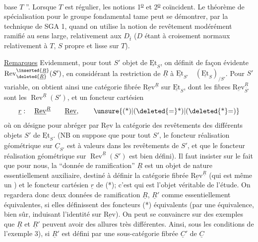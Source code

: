 base $T$ ''. Lorsque $T$ est régulier, les notions 1\textsuperscript{\uline{o}} et 2\textsuperscript{\uline{o}} coïncident. Le théorème de spécialisation pour le groupe fondamental tame peut se démontrer, par la technique de SGA 1, quand on utilise la notion de revêtement modérément ramifié au sens large, relativement aux $D_{\bar{t}}$  ($D$ étant à croisement normaux relativement à $T$, $S$ propre et lisse sur $T$).

\uline{Remarques} Evidemment, pour tout $S'$ objet de $\underline{\mathrm{Et}}_S$, on définit de façon évidente $\operatorname{Rev}_{\deleted{\underline{R}}}^{\inserted{\underline{R}}}(S')$, en considérant la restriction de $\underline{R}$ à $\underline{\mathrm{Et}}_{S'}\quad(\underline{\mathrm{Et}}_S)_{/S'}$. Pour $S'$ variable, on obtient ainsi une catégorie fibrée $\underline{\mathrm{Rev}}^{\underline{R}}$ sur $\underline{\mathrm{Et}}_S$, dont les fibres $\underline{\mathrm{Rev}}_{S'}^{\underline{R}}$ sont les $\operatorname{Rev}^{\underline{R}}(S')$, et un foncteur cartésien
\[
\underline{r}:\quad\underline{\mathrm{Rev}}^{\underline{R}}\qquad\underline{\mathrm{Rev}},
\tag*{\unsure{(*)|(\deleted{=}*)|(\deleted{*}=)}}
\]
où on désigne pour abréger par $\underline{\mathrm{Rev}}$ la catégorie  des revêtements des différents objets $S'$ de $\underline{\mathrm{Et}}_S$. (NB on suppose que pour tout $S'$, le foncteur réalisation géométrique sur $\underline{C}_{S'}$ est à valeurs dans les revêtements de $S'$, et que le foncteur réalisation géométrique sur $\operatorname{Rev}^{\underline{R}}(S')$ est bien défini). Il faut insister sur le fait que pour nous, la ``donnée de ramification'' $\underline{R}$ est un objet de nature essentiellement auxiliaire, destiné à définir la catégorie fibrée $\underline{\mathrm{Rev}}^{\underline{R}}$ (qui est même un \uline{}) et le foncteur cartésien $\underline{r}$ de (*); c'est \unsure{(*)|(\deleted{=}*)|(\deleted{*}=)} qui est l'objet véritable de l'étude. On regardera donc deux données de ramification $\underline{R}$, $\underline{R}'$ comme essentiellement équivalentes, si elles définissent des foncteurs (*) équivalents (par une équivalence, bien sûr, induisant l'identité sur $\underline{\mathrm{Rev}}$). On peut se convaincre sur des exemples que $\underline{R}$ et $\underline{R}'$ peuvent avoir des allures très différentes. Ainsi, sous les conditions de l'exemple 3), si $\underline{R}'$ est défini par une sous-catégorie fibrée  $\underline{C}'$ de $\underline{C}$
